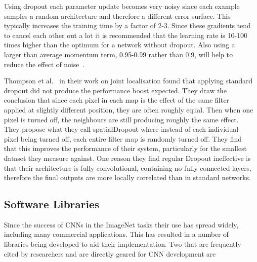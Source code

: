 \documentclass[11pt]{article} %
\begin{document}
Using dropout each parameter update becomes very noisy since each example samples a random architecture and therefore a different error surface. This typically increases the training time by a factor of 2-3. Since these gradients tend to cancel each other out a lot it is recommended that the learning rate is 10-100 times higher than the optimum for a network without dropout. Also using a larger than average momentum term, 0.95-0.99 rather than 0.9, will help to reduce the effect of noise~\cite{Hinton2014}.

Thompson et al.~\cite{Tompson} in their work on joint localisation found that applying standard dropout did not produce the performance boost expected. They draw the conclusion that since each pixel in each map is the effect of the same filter applied at slightly different position, they are often roughly equal. Then when one pixel is turned off, the neighbours are still producing roughly the same effect. They propose what they call spatialDropout where instead of each individual pixel being turned off, each entire filter map is randomly turned off. They find that this improves the performance of their system, particularly for the smallest dataset they measure against. One reason they find regular Dropout ineffective is that their architecture is fully convolutional, containing no fully connected layers, therefore the final outputs are more locally correlated than in standard networks.


\subsection{Software Libraries}
\label{sec:softwareLibraries}
Since the success of CNNs in the ImageNet tasks their use has spread widely, including many commercial applications. This has resulted in a number of libraries being developed to aid their implementation. Two that are frequently cited by researchers and are directly geared for CNN development are
\end{document}
